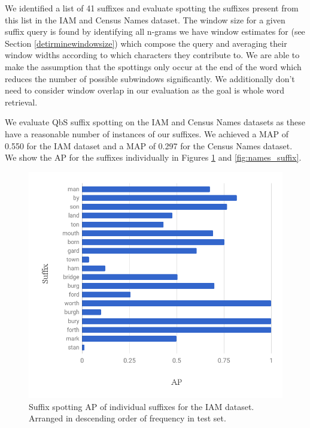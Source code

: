 \documentclass[ms,electronic,twosidetoc,letterpaper,chaptercenter,parttop,lol,lof,lot]{byumsphd}
\begin{document}
We identified a list of 41 suffixes and evaluate spotting the suffixes present from this list in the IAM and Census Names dataset. 
 The window size for a given suffix query is found by identifying all n-grams we have window estimates for (see Section \ref{detirminewindowsize}) which compose the query and averaging their window widths according to which characters they contribute to.
We are able to make the assumption that the spottings only occur at the end of the word which reduces the number of possible subwindows significantly. We additionally don't need to consider window overlap in our evaluation as the goal is whole word retrieval.

We evaluate QbS suffix spotting on the IAM and Census Names datasets as these have a reasonable number of instances of our suffixes. We achieved a MAP of 0.550 for the IAM dataset and a MAP of 0.297 for the Census Names dataset. We show the AP for the suffixes individually in Figures \ref{fig:IAM_suffix} and \ref{fig:names_suffix}.




\begin{figure}
    \centering
    \includegraphics[width=.75\textwidth]{suffix_IAM_ap}
    \caption{Suffix spotting AP of individual suffixes for the IAM dataset. Arranged in descending order of frequency in test set.}
    \label{fig:IAM_suffix}
\end{figure}
\end{document}
